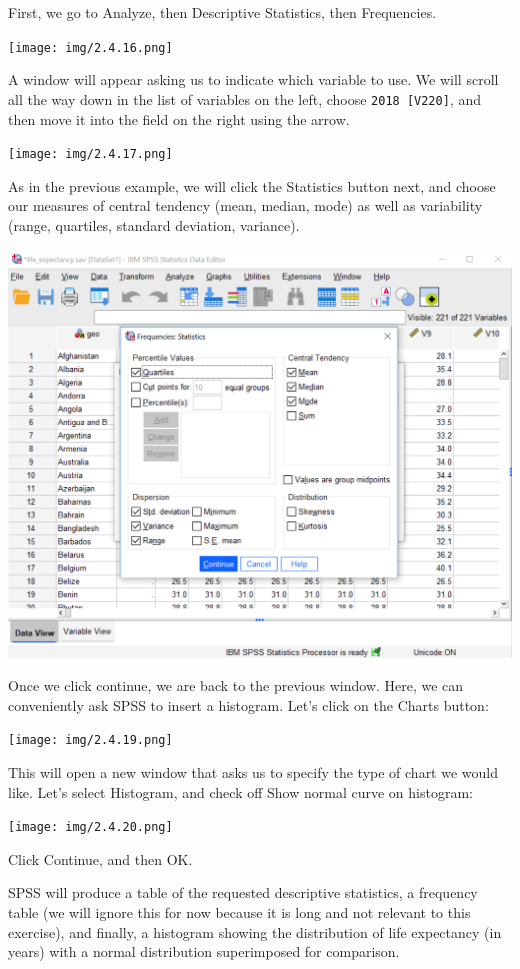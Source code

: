\documentclass[
]{book}
\begin{document}
First, we go to {Analyze}, then {Descriptive Statistics}, then {Frequencies}.

\texttt{[image: img/2.4.16.png]}

A window will appear asking us to indicate which variable to use. We will scroll all the way down in the list of variables on the left, choose \texttt{2018\ {[}V220{]}}, and then move it into the field on the right using the arrow.

\texttt{[image: img/2.4.17.png]}

As in the previous example, we will click the {Statistics} button next, and choose our measures of central tendency {(mean, median, mode)} as well as variability {(range, quartiles, standard deviation, variance)}.

\includegraphics{img/2.4.18.png}

Once we click continue, we are back to the previous window. Here, we can conveniently ask SPSS to insert a histogram. Let's click on the {Charts} button:

\texttt{[image: img/2.4.19.png]}

This will open a new window that asks us to specify the type of chart we would like. Let's select {Histogram}, and check off {Show normal curve on histogram}:

\texttt{[image: img/2.4.20.png]}

Click {Continue}, and then {OK}.

SPSS will produce a table of the requested descriptive statistics, a frequency table (we will ignore this for now because it is long and not relevant to this exercise), and finally, a histogram showing the distribution of life expectancy (in years) with a normal distribution superimposed for comparison.
\end{document}

